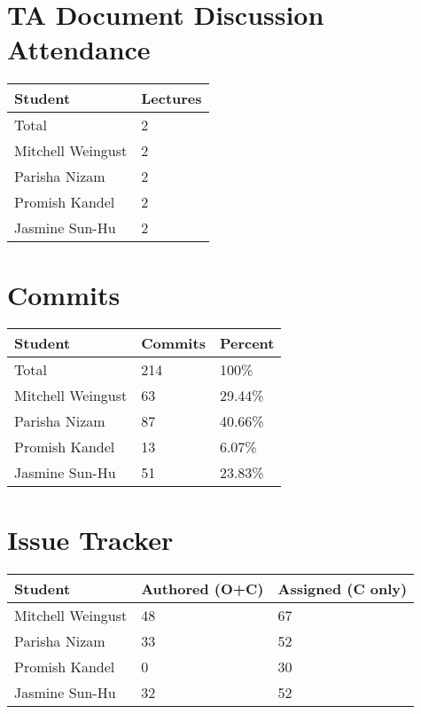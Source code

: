\documentclass{article}
\begin{document}
\section{TA Document Discussion Attendance}

\begin{table}[H]
\centering
\begin{tabular}{ll}
\toprule
\textbf{Student} & \textbf{Lectures}\\
\midrule
Total & 2\\
Mitchell Weingust & 2\\
Parisha Nizam & 2\\
Promish Kandel & 2\\
Jasmine Sun-Hu & 2\\
\bottomrule
\end{tabular}
\end{table}

\section{Commits}

\begin{table}[H]
\centering
\begin{tabular}{lll}
\toprule
\textbf{Student} & \textbf{Commits} & \textbf{Percent}\\
\midrule
Total & 214 & 100\% \\
Mitchell Weingust & 63 & 29.44\% \\
Parisha Nizam & 87 & 40.66\% \\
Promish Kandel & 13 & 6.07\% \\
Jasmine Sun-Hu & 51 & 23.83\% \\
\bottomrule
\end{tabular}
\end{table}

\section{Issue Tracker}

\begin{table}[H]
\centering
\begin{tabular}{lll}
\toprule
\textbf{Student} & \textbf{Authored (O+C)} & \textbf{Assigned (C only)}\\
\midrule
Mitchell Weingust & 48 & 67 \\
Parisha Nizam & 33 & 52 \\
Promish Kandel & 0 & 30 \\
Jasmine Sun-Hu & 32 & 52 \\
\bottomrule
\end{tabular}
\end{table}
\end{document}
